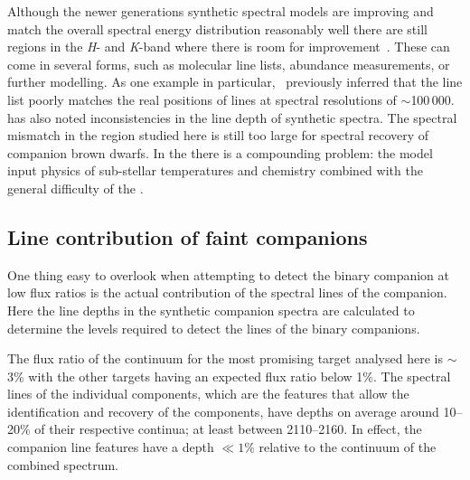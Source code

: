 
Although the newer generations synthetic spectral models are improving and match the overall spectral energy distribution reasonably well there are still regions in the \emph{H}- and \emph{K}-band where there is room for improvement~\citep{rajpurohit_spectral_2016}.
These can come in several forms, such as molecular line lists, abundance measurements, or further modelling.
As one example in particular,~\citet{rajpurohit_spectral_2016} previously inferred that the  line list poorly matches the real positions of  lines at spectral resolutions of \(\sim\)100\,000.
\citet{passegger_carmenes_2018} has also noted inconsistencies in the line depth of synthetic spectra.
The spectral mismatch in the region studied here is still too large for spectral recovery of companion brown dwarfs.
In the \nir{} there is a compounding problem: the model input physics of sub-stellar temperatures and chemistry combined with the general difficulty of the \nir{}.

\subsection{Line contribution of faint companions}
\label{subsec:line_contributions}
One thing easy to overlook when attempting to detect the binary companion at low flux ratios is the actual contribution of the spectral lines of the companion.
Here the line depths in the synthetic companion spectra are calculated to determine the \snr{} levels required to detect the lines of the binary companions.

The flux ratio of the continuum for the most promising target analysed here is \FtwoFone{}\(\sim\)3\% with the other targets having an expected flux ratio below 1\%.
The spectral lines of the individual components, which are the features that allow the identification and recovery of the components, have depths on average around 10--20\% of their respective continua; at least between 2110--2160\nm{}.
In effect, the companion line features have a depth \(\ll 1\%\) relative to the continuum of the combined spectrum.

